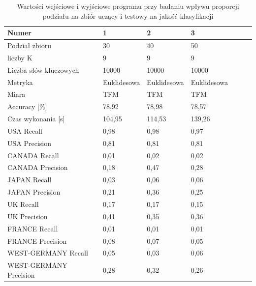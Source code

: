 \documentclass{classrep}
\begin{document}
{{            \begin{table}[!htbp]
                \centering
                \begin{tabular}{|l|l|l|l|l|l|l|}
                    \hline
                    Numer                  & 1              & 2             & 3                \\ \hline
                    Podział zbioru         & 30		        & 40		    & 50		       \\ \hline
                    liczby K               & 9			    & 9			    & 9			       \\ \hline
                    Liczba słów kluczowych & 10000		    & 10000		    & 10000		       \\ \hline
                    Metryka                & Euklidesowa	& Euklidesowa	& Euklidesowa	   \\ \hline
                    Miara                  & TFM		    & TFM		    & TFM		       \\ \hline
                    Accuracy {[}\%{]}      & 78,92		    & 78,98		    & 78,57		       \\ \hline
                    Czas wykonania {[}s{]} & 104,95	        & 114,53	    & 139,26	       \\ \hline
                    USA Recall             & 0,98		    & 0,98		    & 0,97		       \\ \hline
                    USA Precision          & 0,81		    & 0,81		    & 0,81		       \\ \hline
                    CANADA Recall          & 0,01		    & 0,02		    & 0,02		       \\ \hline
                    CANADA Precision       & 0,18		    & 0,47		    & 0,28		       \\ \hline
                    JAPAN Recall           & 0,03		    & 0,06		    & 0,06		       \\ \hline
                    JAPAN Precision        & 0,21		    & 0,36		    & 0,25		       \\ \hline
                    UK Recall              & 0,17		    & 0,17		    & 0,15		       \\ \hline
                    UK Precision           & 0,41		    & 0,35		    & 0,36		       \\ \hline
                    FRANCE Recall          & 0,01		    & 0,01		    & 0,01		       \\ \hline
                    FRANCE Precision       & 0,08		    & 0,07		    & 0,05		       \\ \hline
                    WEST-GERMANY Recall    & 0,05		    & 0,03		    & 0,06		       \\ \hline
                    WEST-GERMANY Precision & 0,28		    & 0,32		    & 0,26		       \\ \hline
                    \end{tabular}
                    \caption{Wartości wejściowe i wyjściowe programu przy badaniu wpływu proporcji podziału na zbiór uczący i testowy na jakość klasyfikacji} \label{table-podzial1}
                \end{table}
                \FloatBarrier

}}
\end{document}

